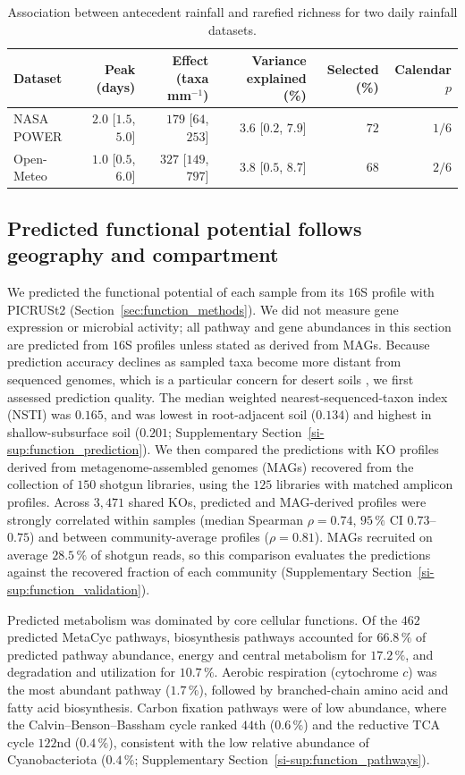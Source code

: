 \documentclass[fleqn,10pt,numbers]{olplainarticle}
\let\LaTeXbegin\begin \let\LaTeXend\end
\let\begin\LaTeXbegin \let\end\LaTeXend
\begin{document}
\begin{table}[htbp]
\centering\footnotesize
\caption{Association between antecedent rainfall and rarefied richness for two
daily rainfall datasets.}
\label{tab:rainfall}
\begin{tabular}{lrrrrr}
\toprule
Dataset & Peak (days) & Effect (taxa mm$^{-1}$) & Variance explained (\%) & Selected (\%) & Calendar $p$ \\
\midrule
NASA POWER & $2.0$ [$1.5$, $5.0$] & $179$ [$64$, $253$]  & $3.6$ [$0.2$, $7.9$] & $72$ & $1/6$ \\
Open-Meteo & $1.0$ [$0.5$, $6.0$] & $327$ [$149$, $797$] & $3.8$ [$0.5$, $8.7$] & $68$ & $2/6$ \\
\bottomrule
\end{tabular}
\end{table}

\subsection*{Predicted functional potential follows geography and compartment}

We predicted the functional potential of each sample from its $16$S profile with PICRUSt2 \cite{douglas2020picrust2} (Section~\ref{sec:function_methods}). We did not measure gene expression or microbial activity; all pathway and gene abundances in this section are predicted from $16$S profiles unless stated as derived from MAGs. Because prediction accuracy declines as sampled taxa become more distant from sequenced genomes, which is a particular concern for desert soils \cite{li2023capturing}, we first assessed prediction quality. The median weighted nearest-sequenced-taxon index (NSTI) was $0.165$, and was lowest in root-adjacent soil ($0.134$) and highest in shallow-subsurface soil ($0.201$; Supplementary Section~\ref{si-sup:function_prediction}). We then compared the predictions with KO profiles derived from metagenome-assembled genomes (MAGs) recovered from the collection of $150$ shotgun libraries, using the $125$ libraries with matched amplicon profiles. Across $3{,}471$ shared KOs, predicted and MAG-derived profiles were strongly correlated within samples (median Spearman $\rho=0.74$, $95\,\%$ CI $0.73$--$0.75$) and between community-average profiles ($\rho=0.81$). MAGs recruited on average $28.5\,\%$ of shotgun reads, so this comparison evaluates the predictions against the recovered fraction of each community (Supplementary Section~\ref{si-sup:function_validation}).

Predicted metabolism was dominated by core cellular functions. Of the $462$ predicted MetaCyc pathways, biosynthesis pathways accounted for $66.8\,\%$ of predicted pathway abundance, energy and central metabolism for $17.2\,\%$, and degradation and utilization for $10.7\,\%$. Aerobic respiration (cytochrome $c$) was the most abundant pathway ($1.7\,\%$), followed by branched-chain amino acid and fatty acid biosynthesis. Carbon fixation pathways were of low abundance, where the Calvin--Benson--Bassham cycle ranked $44$th ($0.6\,\%$) and the reductive TCA cycle $122$nd ($0.4\,\%$), consistent with the low relative abundance of Cyanobacteriota ($0.4\,\%$; Supplementary Section~\ref{si-sup:function_pathways}).
\end{document}
